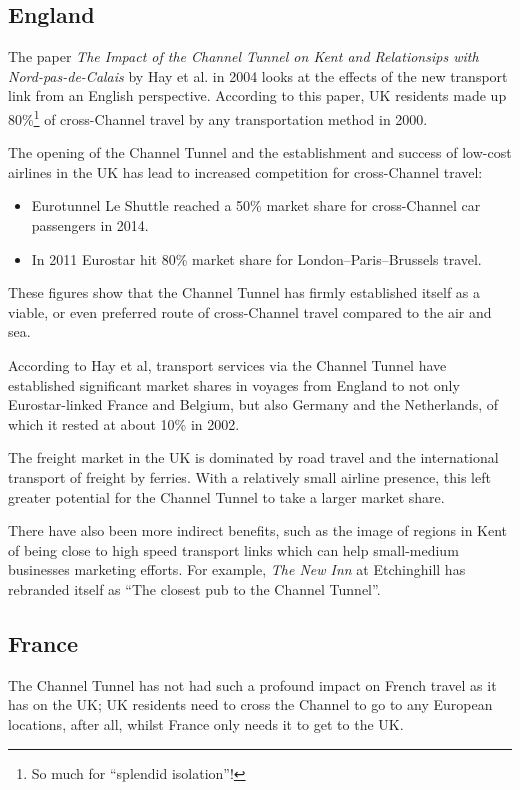 \documentclass[12pt]{article} %
\begin{document}
\subsection{England}
The paper \textit{The Impact of the Channel Tunnel on Kent and Relationsips with Nord-pas-de-Calais} by Hay et al. in 2004\cite{hay04} looks at the effects of the new transport link from an English perspective. According to this paper, UK residents made up 80\%\footnote{So much for ``splendid isolation''!} of cross-Channel travel by any transportation method in 2000.

The opening of the Channel Tunnel and the establishment and success of low-cost airlines in the UK has lead to increased competition for cross-Channel travel:
\begin{itemize}
\item Eurotunnel Le Shuttle reached a 50\% market share for cross-Channel car passengers in 2014.
\item In 2011 Eurostar hit 80\% market share for London--Paris--Brussels travel.\cite{star11}
\end{itemize}

These figures show that the Channel Tunnel has firmly established itself as a viable, or even preferred route of cross-Channel travel compared to the air and sea.

According to Hay et al, transport services via the Channel Tunnel have established significant market shares in voyages from England to not only Eurostar-linked France and Belgium, but also Germany and the Netherlands, of which it rested at about 10\% in 2002.

The freight market in the UK is dominated by road travel and the international transport of freight by ferries. With a relatively small airline presence, this left greater potential for the Channel Tunnel to take a larger market share.

There have also been more indirect benefits, such as the image of regions in Kent of being close to high speed transport links which can help small-medium businesses marketing efforts. For example, \emph{The New Inn} at Etchinghill has rebranded itself as ``The closest pub to the Channel Tunnel''.

\subsection{France}
The Channel Tunnel has not had such a profound impact on French travel as it has on the UK; UK residents need to cross the Channel to go to any European locations, after all, whilst France only needs it to get to the UK.
\end{document}
